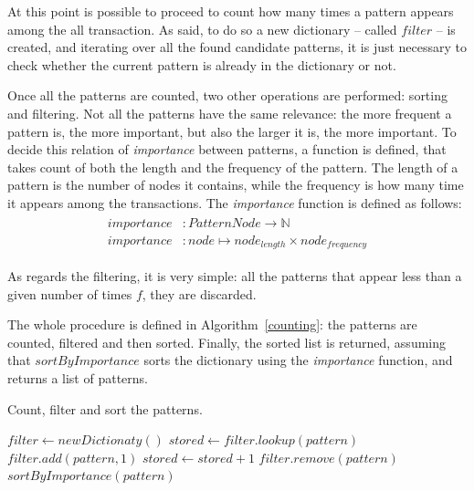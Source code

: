 \documentclass{acm_proc_article-sp-sigmod09}
\begin{document}
At this point is possible to proceed to count how many times a pattern appears among the all transaction. As said, to do so a new dictionary -- called $filter$ -- is created, and iterating over all the found candidate patterns, it is just necessary to check whether the current pattern is already in the dictionary or not.

Once all the patterns are counted, two other operations are performed: sorting and filtering. Not all the patterns have the same relevance: the more frequent a pattern is, the more important, but also the larger it is, the more important. To decide this relation of \emph{importance} between patterns, a function is defined, that takes count of both the length and the frequency of the pattern. The length of a pattern is the number of nodes it contains, while the frequency is how many time it appears among the transactions. The \emph{importance} function is defined as follows:
\begin{gather}
\begin{split}
importance & \colon PatternNode \to \mathbb{N} \\
importance & \colon node \mapsto node_{length} \times node_{frequency}
\end{split}
\end{gather}

As regards the filtering, it is very simple: all the patterns that appear less than a given number of times $f$, they are discarded.

The whole procedure is defined in Algorithm~\ref{counting}: the patterns are counted, filtered and then sorted. Finally, the sorted list is returned, assuming that $sortByImportance$ sorts the dictionary using the \emph{importance} function, and returns a list of patterns.

\begin{algorithm}
\caption{Count, filter and sort the patterns.}
\label{counting}
\begin{algorithmic}[1]
\State $filter \gets new Dictionaty()$
	\State $stored \gets filter.lookup(pattern)$
		\State $filter.add(pattern, 1)$
	\Else
		\State $stored \gets stored + 1$
	\EndIf
\EndFor
{}
		\State $filter.remove(pattern)$
	\EndIf
\EndFor
\Return $sortByImportance(pattern)$
\EndFunction
\end{algorithmic}
\end{algorithm}
\end{document}

